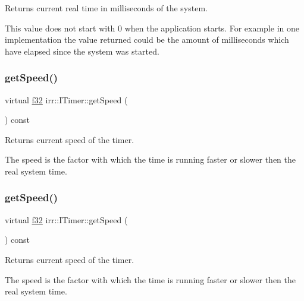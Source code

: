Returns current real time in milliseconds of the system. 

This value does not start with 0 when the application starts. For example in one implementation the value returned could be the amount of milliseconds which have elapsed since the system was started. \mbox{\label{classirr_1_1ITimer_ac2b3c1947d78e5bb9dc62f32edc4e1b2}} 
\subsubsection{\texorpdfstring{get\+Speed()}{getSpeed()}\hspace{0.1cm}{\footnotesize\ttfamily [1/2]}}
{\footnotesize\ttfamily virtual \hyperlink{namespaceirr_a0277be98d67dc26ff93b1a6a1d086b07}{f32} irr\+::\+I\+Timer\+::get\+Speed (\begin{DoxyParamCaption}{ }\end{DoxyParamCaption}) const\hspace{0.3cm}{\ttfamily [pure virtual]}}



Returns current speed of the timer. 

The speed is the factor with which the time is running faster or slower then the real system time. \mbox{\label{classirr_1_1ITimer_ac2b3c1947d78e5bb9dc62f32edc4e1b2}} 
\subsubsection{\texorpdfstring{get\+Speed()}{getSpeed()}\hspace{0.1cm}{\footnotesize\ttfamily [2/2]}}
{\footnotesize\ttfamily virtual \hyperlink{namespaceirr_a0277be98d67dc26ff93b1a6a1d086b07}{f32} irr\+::\+I\+Timer\+::get\+Speed (\begin{DoxyParamCaption}{ }\end{DoxyParamCaption}) const\hspace{0.3cm}{\ttfamily [pure virtual]}}



Returns current speed of the timer. 

The speed is the factor with which the time is running faster or slower then the real system time. \mbox{\label{classirr_1_1ITimer_aa2c53890268d6886b3b5bbf2af5dba9c}} 
